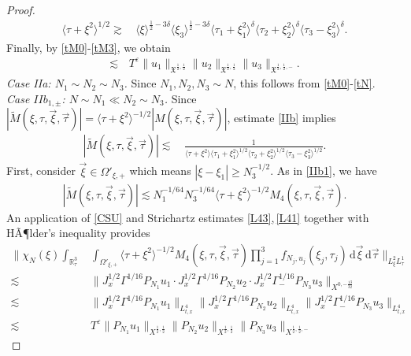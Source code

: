 \documentclass[reqno]{amsart}
\theoremstyle{Definitionl}
\theoremstyle{Definitionk}
\theoremstyle{definition}
\theoremstyle{Satzk}
\theoremstyle{Satzl}
\theoremstyle{Bemerkung}
\begin{document}
\begin{proof}
\begin{align}
\langle\tau+\xi^2\rangle^{1/2}\gtrsim&\, 
\langle\xi\rangle^{\frac12-3\delta}\langle\xi_3\rangle^{\frac12-3\delta}\langle\tau_1+\xi_1^2\rangle^{\delta}\langle\tau_2+\xi_2^2\rangle^{\delta}\langle\tau_3-\xi_3^2\rangle^{\delta}.\label{Party}
\end{align}
Finally, by \eqref{tM0}-\eqref{tM3}, we obtain
\begin{align*}
\lesssim&\, T^\varepsilon\|u_1\|_{\mathfrak X^{\frac12,\frac12}}\|u_2\|_{\mathfrak X^{\frac12,\frac12}}\|u_3\|_{\mathfrak X^{\frac12,\frac12,-}}.
\end{align*}
\emph{Case IIa: $N_1\sim N_2\sim N_3$. }Since $N_1,N_2,N_3\sim N$, this follows from \eqref{tM0}-\eqref{tN}.\\[10pt]
\emph{Case $IIb_{1,\pm}$: $N\sim N_1\ll N_2\sim N_3$. }Since $|\tilde M(\xi,\tau,\vec\xi,\vec\tau)|= \langle\tau+\xi^2\rangle^{-1/2}|M(\xi,\tau,\vec\xi,\vec\tau)|$, estimate \eqref{IIb} implies
\begin{align*}
|\tilde M(\xi,\tau,\vec\xi,\vec\tau)|
\lesssim&\,\frac{1}{\langle\tau+\xi^2\rangle\langle\tau_1+\xi_1^2\rangle^{1/2}\langle\tau_2+\xi_2^2\rangle^{1/2}\langle\tau_3-\xi_3^2\rangle^{1/2}}.
\end{align*}
First, consider $\vec\xi\in \Omega'_{\xi,+}$ which means $|\xi-\xi_1|\ge N_3^{-1/2}$. As in \eqref{IIb1}, we have
\begin{align}
|\tilde M(\xi,\tau,\vec\xi,\vec\tau)|\lesssim N_1^{-1/64}N_3^{-1/64}\langle\tau+\xi^2\rangle^{-1/2}M_4(\xi,\tau,\vec\xi,\vec\tau)\label{61}.
\end{align}
An application of \eqref{CSU} and Strichartz estimates \eqref{L43},\,\eqref{L41} together with HÃ¶lder's inequality provides 
\begin{align*}
\Big\|\chi_N(\xi)\int_{\mathbb R^3_\tau}&\,\int_{\Omega'_{\xi,+}}\langle\tau+\xi^2\rangle^{-1/2}M_4(\xi,\tau,\vec\xi,\vec\tau)\prod_{j=1}^3f_{N_j,u_j}(\xi_j,\tau_j)\,\mathrm d\vec\xi\,\mathrm d\vec\tau\Big\|_{L^2_\xi L^1_\tau}\\
\lesssim&\, \big\|J_x^{1/2}\Gamma^{1/16}P_{N_1}u_1\cdot J_x^{1/2}\Gamma^{1/16}P_{N_2}u_2\cdot J_x^{1/2}\Gamma^{1/16}_-P_{N_3}u_3\big\|_{X^{0,-\frac{13}{32}}}\\
\lesssim&\, \big\|J_x^{1/2}\Gamma^{1/16}P_{N_1}u_1\big\|_{L^4_{t,x}}\big\|J_x^{1/2}\Gamma^{1/16}P_{N_2}u_2\big\|_{L^4_{t,x}}\big\|J_x^{1/2}\Gamma^{1/16}_-P_{N_3}u_3\big\|_{L^4_{t,x}}\\
\lesssim&\, 
T^\varepsilon\|P_{N_1}u_1\|_{X^{\frac12,\frac12}}\|P_{N_2}u_2\|_{X^{\frac12,\frac12}}\|P_{N_3}u_3\|_{X^{\frac12,\frac12,-}}

\end{align*}
\end{proof}
\end{document}
